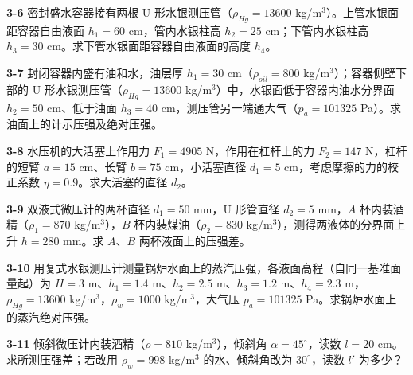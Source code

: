 \begin{ti}
\item[\textbf{3-6}] 密封盛水容器接有两根 U 形水银测压管（$\rho_{Hg}=13600$ kg/m$^3$）。上管水银面距容器自由液面 $h_1=60$ cm，管内水银柱高 $h_2=25$ cm；下管内水银柱高 $h_3=30$ cm。求下管水银面距容器自由液面的高度 $h_4$。
\quad{}\quad{}

\item[\textbf{3-7}] 封闭容器内盛有油和水，油层厚 $h_1=30$ cm（$\rho_{oil}=800$ kg/m$^3$）；容器侧壁下部的 U 形水银测压管（$\rho_{Hg}=13600$ kg/m$^3$）中，水银面低于容器内油水分界面 $h_2=50$ cm、低于油面 $h_3=40$ cm，测压管另一端通大气（$p_a=101325$ Pa）。求油面上的计示压强及绝对压强。
\quad{}\quad{}

\item[\textbf{3-8}] 水压机的大活塞上作用力 $F_1=4905$ N，作用在杠杆上的力 $F_2=147$ N，杠杆的短臂 $a=15$ cm、长臂 $b=75$ cm，小活塞直径 $d_1=5$ cm，考虑摩擦的力的校正系数 $\eta=0.9$。求大活塞的直径 $d_2$。
\quad{}\quad{}

\item[\textbf{3-9}] 双液式微压计的两杯直径 $d_1=50$ mm，U 形管直径 $d_2=5$ mm，$A$ 杯内装酒精（$\rho_1=870$ kg/m$^3$），$B$ 杯内装煤油（$\rho_2=830$ kg/m$^3$），测得两液体的分界面上升 $h=280$ mm。求 $A$、$B$ 两杯液面上的压强差。
\quad{}\quad{}

\item[\textbf{3-10}] 用复式水银测压计测量锅炉水面上的蒸汽压强，各液面高程（自同一基准面量起）为 $H=3$ m、$h_1=1.4$ m、$h_2=2.5$ m、$h_3=1.2$ m、$h_4=2.3$ m，$\rho_{Hg}=13600$ kg/m$^3$，$\rho_w=1000$ kg/m$^3$，大气压 $p_a=101325$ Pa。求锅炉水面上的蒸汽绝对压强。
\quad{}\quad{}

\item[\textbf{3-11}] 倾斜微压计内装酒精（$\rho=810$ kg/m$^3$），倾斜角 $\alpha=45^\circ$，读数 $l=20$ cm。求所测压强差；若改用 $\rho_w=998$ kg/m$^3$ 的水、倾斜角改为 $30^\circ$，读数 $l'$ 为多少？
\quad{}\quad{}


\end{ti}
